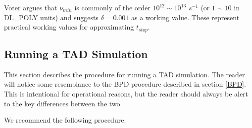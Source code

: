 Voter \cite{voter-00a} argues that $\nu_{min}$ is commonly of the order
$10^{12}\sim 10^{13}$ $s^{-1}$ (or $1 \sim 10$ in DL\_POLY units) and
suggests $\delta=0.001$ as a working value. These represent practical
working values for approximating $t_{stop}$.

\subsection{Running a TAD Simulation}

This section describes the procedure for running a TAD simulation.
The reader will notice some resemblance to the BPD procedure described
in section \ref{BPD}. This is intentional for operational reasons, but
the reader should always be alert to the key differences between the two.

We recommend the following procedure.
